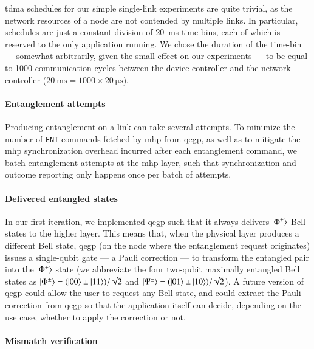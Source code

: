 \acrshort{tdma} schedules for our simple single-link experiments are quite trivial, as the network
resources of a node are not contended by multiple links. In particular, schedules are just a
constant division of \qty{20}{\ms} time bins, each of which is reserved to the only application
running. We chose the duration of the time-bin --- somewhat arbitrarily, given the small effect on
our experiments --- to be equal to \num{1000} communication cycles between the device controller and
the network controller ($\qty{20}{\ms} = \num{1000} × \qty{20}{\us}$).

\paragraph{Entanglement attempts}

Producing entanglement on a link can take several attempts. To minimize the number of \texttt{ENT}
commands fetched by \acrshort{mhp} from \acrshort{qegp}, as well as to mitigate the \acrshort{mhp}
synchronization overhead incurred after each entanglement command, we batch entanglement attempts at
the \acrshort{mhp} layer, such that synchronization and outcome reporting only happens once per
batch of attempts.

\paragraph{Delivered entangled states}

In our first iteration, we implemented \acrshort{qegp} such that it always delivers $\ket{\Phi^+}$
Bell states to the higher layer. This means that, when the physical layer produces a different Bell
state, \acrshort{qegp} (on the node where the entanglement request originates) issues a single-qubit
gate --- a Pauli correction --- to transform the entangled pair into the $\ket{\Phi^+}$ state (we
abbreviate the four two-qubit maximally entangled Bell states as $\ket{\Phi^\pm} = (\ket{00} \pm
\ket{11})/\sqrt{2}$ and $\ket{\Psi^\pm} = (\ket{01} \pm \ket{10})/\sqrt{2}$). A future version of
\acrshort{qegp} could allow the user to request any Bell state, and could extract the Pauli
correction from \acrshort{qegp} so that the application itself can decide, depending on the use
case, whether to apply the correction or not.

\paragraph{Mismatch verification}

